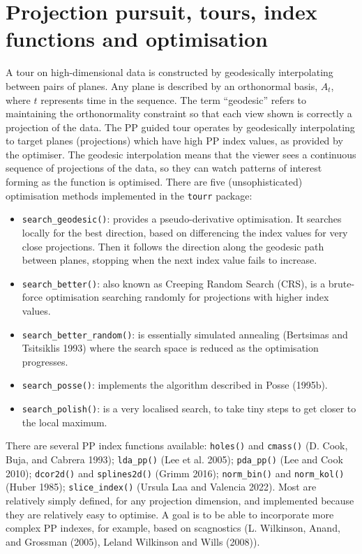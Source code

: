 \documentclass[
  12pt,
]{interact}
\providecommand{\tightlist}{%
  \setlength{\itemsep}{0pt}\setlength{\parskip}{0pt}}\usepackage{longtable,booktabs,array}
\theoremstyle{plain}
\begin{document}
\hypertarget{sec-background}{%
\section{Projection pursuit, tours, index functions and
optimisation}\label{sec-background}}

A tour on high-dimensional data is constructed by geodesically
interpolating between pairs of planes. Any plane is described by an
orthonormal basis, \(A_t\), where \(t\) represents time in the sequence.
The term ``geodesic'' refers to maintaining the orthonormality
constraint so that each view shown is correctly a projection of the
data. The PP guided tour operates by geodesically interpolating to
target planes (projections) which have high PP index values, as provided
by the optimiser. The geodesic interpolation means that the viewer sees
a continuous sequence of projections of the data, so they can watch
patterns of interest forming as the function is optimised. There are
five (unsophisticated) optimisation methods implemented in the
\texttt{tourr} package:

\begin{itemize}
\tightlist
\item
  \texttt{search\_geodesic()}: provides a pseudo-derivative
  optimisation. It searches locally for the best direction, based on
  differencing the index values for very close projections. Then it
  follows the direction along the geodesic path between planes, stopping
  when the next index value fails to increase.
\item
  \texttt{search\_better()}: also known as Creeping Random Search (CRS),
  is a brute-force optimisation searching randomly for projections with
  higher index values.
\item
  \texttt{search\_better\_random()}: is essentially simulated annealing
  (Bertsimas and Tsitsiklis 1993) where the search space is reduced as
  the optimisation progresses.
\item
  \texttt{search\_posse()}: implements the algorithm described in Posse
  (1995b).
\item
  \texttt{search\_polish()}: is a very localised search, to take tiny
  steps to get closer to the local maximum.
\end{itemize}

There are several PP index functions available: \texttt{holes()} and
\texttt{cmass()} (D. Cook, Buja, and Cabrera 1993); \texttt{lda\_pp()}
(Lee et al. 2005); \texttt{pda\_pp()} (Lee and Cook 2010);
\texttt{dcor2d()} and \texttt{splines2d()} (Grimm 2016);
\texttt{norm\_bin()} and \texttt{norm\_kol()} (Huber 1985);
\texttt{slice\_index()} (Ursula Laa and Valencia 2022). Most are
relatively simply defined, for any projection dimension, and implemented
because they are relatively easy to optimise. A goal is to be able to
incorporate more complex PP indexes, for example, based on scagnostics
(L. Wilkinson, Anand, and Grossman (2005), Leland Wilkinson and Wills
(2008)).
\end{document}
